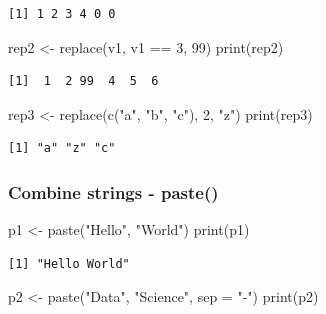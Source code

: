 \documentclass[
  letterpaper,
  DIV=11,
  numbers=noendperiod]{scrartcl}
\newenvironment{Shaded}{\begin{snugshade}}{\end{snugshade}}
\newcommand{\AttributeTok}[1]{\textcolor[rgb]{0.40,0.45,0.13}{#1}}
\newcommand{\DecValTok}[1]{\textcolor[rgb]{0.68,0.00,0.00}{#1}}
\newcommand{\FunctionTok}[1]{\textcolor[rgb]{0.28,0.35,0.67}{#1}}
\newcommand{\NormalTok}[1]{\textcolor[rgb]{0.00,0.23,0.31}{#1}}
\newcommand{\OtherTok}[1]{\textcolor[rgb]{0.00,0.23,0.31}{#1}}
\newcommand{\SpecialCharTok}[1]{\textcolor[rgb]{0.37,0.37,0.37}{#1}}
\newcommand{\StringTok}[1]{\textcolor[rgb]{0.13,0.47,0.30}{#1}}
\begin{document}
\begin{verbatim}
[1] 1 2 3 4 0 0
\end{verbatim}

\begin{Shaded}
\begin{Highlighting}[]
\NormalTok{rep2 }\OtherTok{\textless{}{-}} \FunctionTok{replace}\NormalTok{(v1, v1 }\SpecialCharTok{==} \DecValTok{3}\NormalTok{, }\DecValTok{99}\NormalTok{)}
\FunctionTok{print}\NormalTok{(rep2)}
\end{Highlighting}
\end{Shaded}

\begin{verbatim}
[1]  1  2 99  4  5  6
\end{verbatim}

\begin{Shaded}
\begin{Highlighting}[]
\NormalTok{rep3 }\OtherTok{\textless{}{-}} \FunctionTok{replace}\NormalTok{(}\FunctionTok{c}\NormalTok{(}\StringTok{"a"}\NormalTok{, }\StringTok{"b"}\NormalTok{, }\StringTok{"c"}\NormalTok{), }\DecValTok{2}\NormalTok{, }\StringTok{"z"}\NormalTok{)}
\FunctionTok{print}\NormalTok{(rep3)}
\end{Highlighting}
\end{Shaded}

\begin{verbatim}
[1] "a" "z" "c"
\end{verbatim}

\subsubsection{Combine strings - paste()}\label{combine-strings---paste}

\begin{Shaded}
\begin{Highlighting}[]
\NormalTok{p1 }\OtherTok{\textless{}{-}} \FunctionTok{paste}\NormalTok{(}\StringTok{"Hello"}\NormalTok{, }\StringTok{"World"}\NormalTok{)}
\FunctionTok{print}\NormalTok{(p1)}
\end{Highlighting}
\end{Shaded}

\begin{verbatim}
[1] "Hello World"
\end{verbatim}

\begin{Shaded}
\begin{Highlighting}[]
\NormalTok{p2 }\OtherTok{\textless{}{-}} \FunctionTok{paste}\NormalTok{(}\StringTok{"Data"}\NormalTok{, }\StringTok{"Science"}\NormalTok{, }\AttributeTok{sep =} \StringTok{"{-}"}\NormalTok{)}
\FunctionTok{print}\NormalTok{(p2)}
\end{Highlighting}
\end{Shaded}
\end{document}
